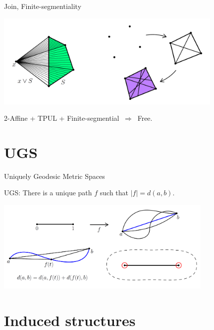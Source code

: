 \documentclass[12pt]{beamer}
\begin{document}
\newpage

\begin{frame}{Join, Finite-segmentiality}
    \centering

    \includegraphics[width = 11cm]{12.png}

    \begin{theorem}
        2-Affine + TPUL + Finite-segmential \(\ \Longrightarrow \ \) Free.
    \end{theorem}
\end{frame}

\newpage


\section*{UGS}

\begin{frame}{Uniquely Geodesic Metric Spaces}
    \begin{definition}
        UGS: There is a unique path \(f\) such that \(|f| = d(a, b)\).
    \end{definition}

    \centering

    \includegraphics[width = 10.5cm]{13.png}
\end{frame}

\newpage

\section*{Induced structures}
\end{document}
